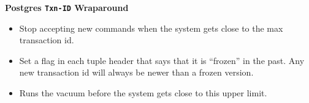 \documentclass[11pt]{article}
\begin{document}
\textbf{Postgres \texttt{Txn-ID} Wraparound}
\begin{itemize}
    \item
    Stop accepting new commands when the system gets close to the max transaction id.
        
    \item
    Set a flag in each tuple header that says that it is ``frozen'' in the past. Any new 
    transaction id will always be newer than a frozen version.
        
    \item
    Runs the vacuum before the system gets close to this upper limit.
\end{itemize}

\newpage


\end{document}
